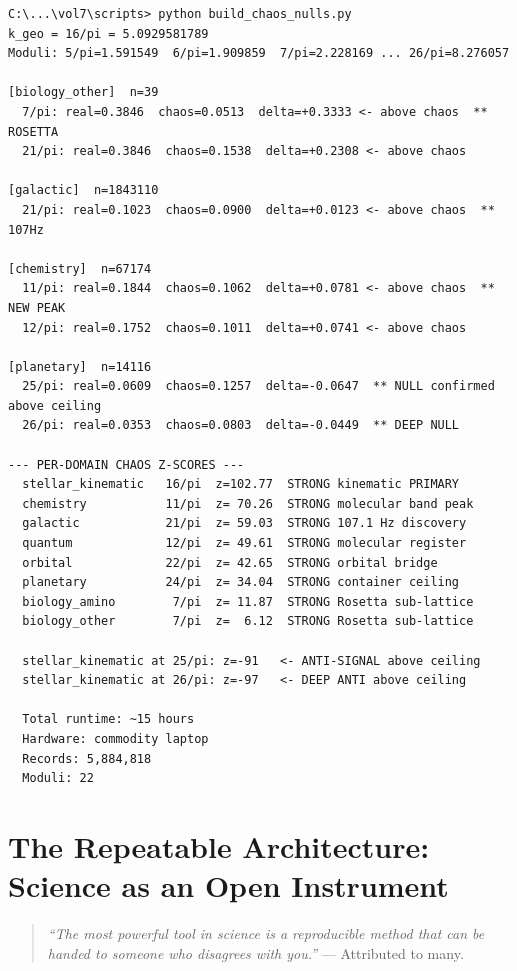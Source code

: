 \documentclass[11pt, letterpaper, openany]{book}
\begin{document}
\begin{lstlisting}[style=terminal]
C:\...\vol7\scripts> python build_chaos_nulls.py
k_geo = 16/pi = 5.0929581789
Moduli: 5/pi=1.591549  6/pi=1.909859  7/pi=2.228169 ... 26/pi=8.276057

[biology_other]  n=39
  7/pi: real=0.3846  chaos=0.0513  delta=+0.3333 <- above chaos  ** ROSETTA
  21/pi: real=0.3846  chaos=0.1538  delta=+0.2308 <- above chaos

[galactic]  n=1843110
  21/pi: real=0.1023  chaos=0.0900  delta=+0.0123 <- above chaos  ** 107Hz

[chemistry]  n=67174
  11/pi: real=0.1844  chaos=0.1062  delta=+0.0781 <- above chaos  ** NEW PEAK
  12/pi: real=0.1752  chaos=0.1011  delta=+0.0741 <- above chaos

[planetary]  n=14116
  25/pi: real=0.0609  chaos=0.1257  delta=-0.0647  ** NULL confirmed above ceiling
  26/pi: real=0.0353  chaos=0.0803  delta=-0.0449  ** DEEP NULL

--- PER-DOMAIN CHAOS Z-SCORES ---
  stellar_kinematic   16/pi  z=102.77  STRONG kinematic PRIMARY
  chemistry           11/pi  z= 70.26  STRONG molecular band peak
  galactic            21/pi  z= 59.03  STRONG 107.1 Hz discovery
  quantum             12/pi  z= 49.61  STRONG molecular register
  orbital             22/pi  z= 42.65  STRONG orbital bridge
  planetary           24/pi  z= 34.04  STRONG container ceiling
  biology_amino        7/pi  z= 11.87  STRONG Rosetta sub-lattice
  biology_other        7/pi  z=  6.12  STRONG Rosetta sub-lattice

  stellar_kinematic at 25/pi: z=-91   <- ANTI-SIGNAL above ceiling
  stellar_kinematic at 26/pi: z=-97   <- DEEP ANTI above ceiling

  Total runtime: ~15 hours
  Hardware: commodity laptop
  Records: 5,884,818
  Moduli: 22
\end{lstlisting}

\chapter{The Repeatable Architecture: Science as an Open Instrument}

\begin{quote}
\textit{``The most powerful tool in science is a reproducible method that can be
handed to someone who disagrees with you.''} --- Attributed to many.
\end{quote}
\end{document}
